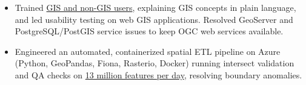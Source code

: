 \documentclass[letterpaper]{article}
\newenvironment{jobtasklist}
        {
            \vspace{-12pt}
            \begin{itemize} \itemsep 0pt
        }{
            \end{itemize}
            \vspace{-3pt}
        }
\newcommand{\impt}[1]{\uline{#1}}
\begin{document}
\begin{jobtasklist}
    \item Trained \impt{GIS and non-GIS users}, explaining GIS concepts in plain language,
            and led usability testing on web GIS applications. Resolved GeoServer
            and PostgreSQL/PostGIS service issues to keep OGC web services available.
    \item Engineered an automated, containerized spatial ETL pipeline on Azure
            (Python, GeoPandas, Fiona, Rasterio, Docker) running intersect validation
            and QA checks on \impt{13 million features per day}, resolving boundary anomalies.
\end{jobtasklist}
\end{document}
